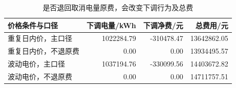 \begin{table}[H]
\centering\small
\caption{是否退回取消电量原费，会改变下调行为及总费}
\label{tab:settlement}
\begin{tabular}{lrrr}\toprule
价格条件与口径 & 下调电量/kWh & 下调净费/元 & 总费用/元 \\\midrule
重复日内价，主口径 & 1022284.79 & -310478.47 & 13642862.05 \\
重复日内价，不退原费 & 0.00 & 0.00 & 13934495.57 \\
波动电价，主口径 & 1037194.76 & -330099.56 & 14403672.82 \\
波动电价，不退原费 & 0.00 & 0.00 & 14711757.51 \\
\bottomrule\end{tabular}
\end{table}
